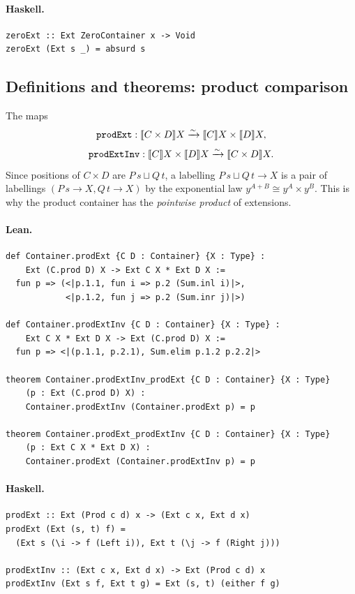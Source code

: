 \documentclass[11pt,a4paper]{article}
\begin{document}
\paragraph{Haskell.}
\begin{lstlisting}[style=haskell]
zeroExt :: Ext ZeroContainer x -> Void
zeroExt (Ext s _) = absurd s
\end{lstlisting}


\subsection{Definitions and theorems: product comparison}

\begin{defn}
The maps
\[
  \texttt{prodExt} : \llbracket C \times D \rrbracket X \xrightarrow{\sim}
    \llbracket C \rrbracket X \times \llbracket D \rrbracket X,
\]
\[
  \texttt{prodExtInv} : \llbracket C \rrbracket X \times \llbracket D \rrbracket X
    \xrightarrow{\sim} \llbracket C \times D \rrbracket X.
\]
Since positions of $C \times D$ are $P\,s \sqcup Q\,t$, a labelling
$P\,s \sqcup Q\,t \to X$ is a pair of labellings $(P\,s \to X, Q\,t \to X)$
by the exponential law $y^{A+B} \cong y^A \times y^B$.  This is why the
product container has the \emph{pointwise product} of extensions.
\end{defn}

\paragraph{Lean.}
\begin{lstlisting}[style=lean]
def Container.prodExt {C D : Container} {X : Type} :
    Ext (C.prod D) X -> Ext C X * Ext D X :=
  fun p => (<|p.1.1, fun i => p.2 (Sum.inl i)|>,
            <|p.1.2, fun j => p.2 (Sum.inr j)|>)

def Container.prodExtInv {C D : Container} {X : Type} :
    Ext C X * Ext D X -> Ext (C.prod D) X :=
  fun p => <|(p.1.1, p.2.1), Sum.elim p.1.2 p.2.2|>

theorem Container.prodExtInv_prodExt {C D : Container} {X : Type}
    (p : Ext (C.prod D) X) :
    Container.prodExtInv (Container.prodExt p) = p

theorem Container.prodExt_prodExtInv {C D : Container} {X : Type}
    (p : Ext C X * Ext D X) :
    Container.prodExt (Container.prodExtInv p) = p
\end{lstlisting}

\paragraph{Haskell.}
\begin{lstlisting}[style=haskell]
prodExt :: Ext (Prod c d) x -> (Ext c x, Ext d x)
prodExt (Ext (s, t) f) =
  (Ext s (\i -> f (Left i)), Ext t (\j -> f (Right j)))

prodExtInv :: (Ext c x, Ext d x) -> Ext (Prod c d) x
prodExtInv (Ext s f, Ext t g) = Ext (s, t) (either f g)
\end{lstlisting}
\end{document}
